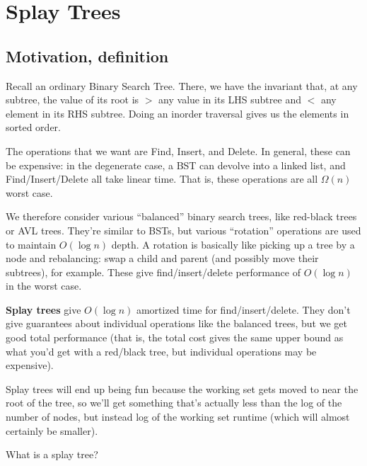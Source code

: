\documentclass{article}
\begin{document}
\section{Splay Trees}

\subsection{Motivation, definition}

Recall an ordinary Binary Search Tree. 
There, we have the invariant that, at any subtree, the value of its root
is $>$ any value in its LHS subtree and $<$ any element in its RHS subtree.
Doing an inorder traversal gives us the elements in sorted order.

The operations that we want are Find, Insert, and Delete.
In general, these can be expensive: in the degenerate case, a BST can 
devolve into a linked list, and Find/Insert/Delete all take linear time.
That is, these operations are all $\Omega(n)$ worst case.

We therefore consider various ``balanced'' binary search trees, like
red-black trees or AVL trees.
They're similar to BSTs, but various ``rotation'' operations are used to
maintain $O(\log n)$ depth.
A rotation is basically like picking up a tree by a node and rebalancing:
swap a child and parent (and possibly move their subtrees), for example.
These give find/insert/delete performance of $O(\log n)$ in the worst case.

\textbf{Splay trees} give $O(\log n)$ amortized time for find/insert/delete.
They don't give guarantees about individual operations like the balanced
trees, but we get good total performance (that is, the total cost gives the
same upper bound as what you'd get with a red/black tree, but individual 
operations may be expensive).

Splay trees will end up being fun because the working set gets moved
to near the root of the tree, so we'll get something that's actually
less than the log of the number of nodes, but instead log of the working
set runtime (which will almost certainly be smaller).

What is a splay tree?
\end{document}
